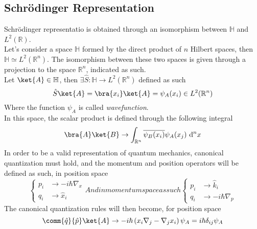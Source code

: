 \documentclass[a4paper, 11pt]{book}
\newcommand{\1}{\opr{\mathds{1}}}
\newcommand{\diff}[2][]{\ \mathrm{d}^{#1}#2}
\newcommand{\opr}[1]{\hat{#1}}
\theoremstyle{plain}
\begin{document}
	\subsection{Schrödinger Representation}
	Schrödinger representatio is obtained through an isomorphism between $\mathbb{H}$ and $L^2(\mathbb{R})$.\\
	Let's consider a space $\mathbb{H}$ formed by the direct product of $n$ Hilbert spaces, then $\mathbb{H}\simeq L^2(\mathbb{R}^n)$. The isomorphism between these two spaces is given through a projection to the space $\mathbb{R}^n$, indicated as such.\\
	Let $\ket{A}\in\mathbb{H}$, then $\exists\opr{S}:\mathbb{H}\to L^2(\mathbb{R}^n)$ defined as such
	\begin{equation}
		\opr{S}\ket{A}=\bra{x_i}\ket{A}=\psi_A(x_i)\in L^2(\mathbb{R}^n)
		\label{eq:schrodingerisom}
	\end{equation}
	Where the function $\psi_A$ is called \textit{wavefunction}.\\
	In this space, the scalar product is defined through the following integral
	\begin{equation}
		\bra{A}\ket{B}\to\int_{\mathbb{R}^n}\overline{\psi_B(x_i)}\psi_A(x_j)\diff[n]{x}
		\label{eq:scalarprodschr}
	\end{equation}
	In order to be a valid representation of quantum mechanics, canonical quantization must hold, and the momentum and position operators will be defined as such, in position space
\begin{subequations}
	\begin{equation}
		\left\{ \begin{aligned}
				p_i&\to-i\hbar\nabla_{x}\\
			q_i&\to \opr{x}_i
	\end{aligned}\right.
		\label{eq:schrquantizationpos}
	\end{equation}
	And in momentum space as such
	\begin{equation}
		\left\{ \begin{aligned}
				p_i&\to \opr{k}_i\\
				q_i&\to-i\hbar\nabla_{p}
		\end{aligned}\right.
		\label{eq:schrquantizationmom}
	\end{equation}
\end{subequations}
	The canonical quantization rules will then become, for position space
	\begin{equation}
		\comm{\opr{q}}{\opr{p}}\ket{A}\to-i\hbar\left( x_i\nabla_j-\nabla_jx_i \right)\psi_A=i\hbar\delta_{ij}\psi_A
		\label{eq:canonicalquantschro}
	\end{equation}
\end{document}
